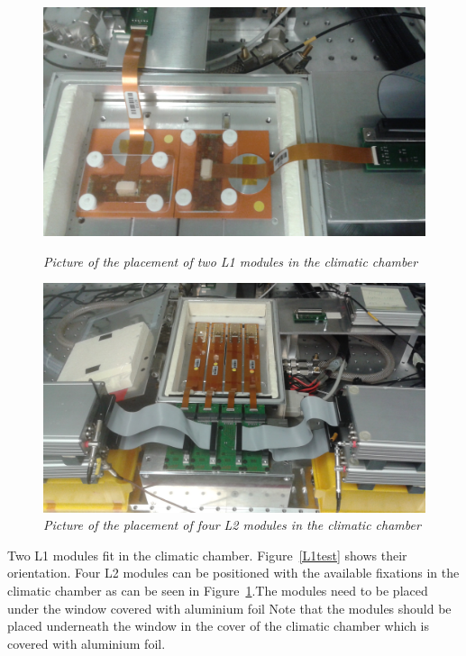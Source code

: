 \documentclass[a4paper,12pt,twoside]{article}
\begin{document}
\begin{figure} [h!]
\centering
\begin{minipage}{.49\textwidth}
  \centering
  \includegraphics[width=\textwidth]{./Figures/L1test.jpg}
  \caption{\em Picture of the placement of two L1 modules in the climatic chamber}
  \label{L1test}
\end{minipage}%
\hspace{1mm}
\begin{minipage}{.49\textwidth}
  \centering
  \includegraphics[width=\textwidth]{./Figures/L2test.jpg}
  \caption{\em Picture of the placement of four L2 modules in the climatic chamber}
  \label{L2test}
\end{minipage}
\end{figure}

Two L1 modules fit in the climatic chamber. Figure~\ref{L1test} shows their orientation.
Four L2 modules can be positioned with the available fixations in the climatic chamber as can be seen in Figure~\ref{L2test}.The modules need to be placed under the window covered with aluminium foil
Note that the modules should be placed underneath the window in the cover of the climatic chamber which is covered with aluminium foil. 
\end{document}

